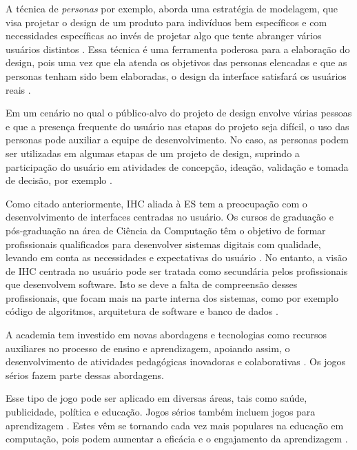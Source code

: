 A técnica de \textit{personas} por exemplo, aborda uma estratégia de modelagem, que visa projetar o design de um produto para indivíduos bem específicos e com necessidades específicas ao invés de projetar algo que tente abranger vários usuários distintos \cite[p. 77]{cooper07}. Essa técnica é uma ferramenta poderosa para a elaboração do design, pois uma vez que ela atenda os objetivos das personas elencadas e que as personas tenham sido bem elaboradas, o design da interface satisfará os usuários reais \cite[p. 77]{cooper07}.

Em um cenário no qual o público-alvo do projeto de design envolve várias pessoas e que a presença frequente do usuário nas etapas do projeto seja difícil, o uso das personas pode auxiliar a equipe de desenvolvimento. No caso, as personas podem ser utilizadas em algumas etapas de um projeto de design, suprindo a participação do usuário em atividades de concepção, ideação, validação e tomada de decisão, por exemplo \cite[p. 80]{Vianna_2014} \cite[p. 155]{BarbosaEtAl2021}.

Como citado anteriormente, IHC aliada à ES tem a preocupação com o desenvolvimento de interfaces centradas no usuário. Os cursos de graduação e pós-graduação na área de Ciência da Computação têm o objetivo de formar profissionais qualificados para desenvolver sistemas digitais com qualidade, levando em conta as necessidades e expectativas do usuário \cite[p. 89,  90]{acm_curricula} \cite[p. 8-16]{BarbosaEtAl2021}. No entanto, a visão de IHC centrada no usuário pode ser tratada como secundária pelos profissionais que desenvolvem software. Isto se deve a falta de compreensão desses profissionais, que focam mais na parte interna dos sistemas, como por exemplo código de algoritmos, arquitetura de software e banco de dados \cite{sommariva}.

A academia tem investido em novas abordagens e tecnologias como recursos auxiliares no processo de ensino e aprendizagem, apoiando assim, o desenvolvimento de atividades pedagógicas inovadoras e colaborativas \cite{battistella, brito, Sales2020, Sales2020UsoTDS}. Os jogos sérios fazem parte dessas abordagens.

Esse tipo de jogo pode ser aplicado em diversas áreas, tais como saúde, publicidade, política e educação. Jogos sérios também incluem jogos para aprendizagem \cite{Becker_2021}. Estes vêm se tornando cada vez mais populares na educação em computação, pois podem aumentar a eficácia e o engajamento da aprendizagem \cite{battistella, brito, queiroz, sales_climaco2016}.

